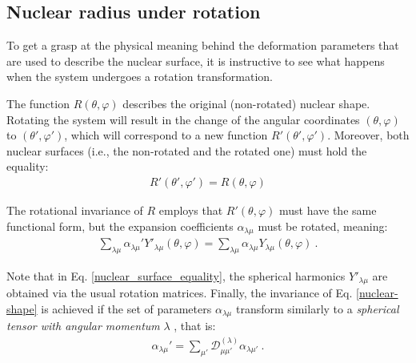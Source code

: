 \subsection{Nuclear radius under rotation}

To get a grasp at the physical meaning behind the deformation parameters that are used to describe the nuclear surface, it is instructive to see what happens when the system undergoes a rotation transformation.

The function $R(\theta,\varphi)$ describes the original (non-rotated) nuclear shape. Rotating the system will result in the change of the angular coordinates $(\theta,\varphi)$ to $(\theta',\varphi')$, which will correspond to a new function $R'(\theta',\varphi')$. Moreover, both nuclear surfaces (i.e., the non-rotated and the rotated one) must hold the equality:
\begin{align}
    R'(\theta',\varphi')=R(\theta,\varphi)
\end{align}

The rotational invariance of $R$ employs that $R'(\theta,\varphi)$ must have the same functional form, but the expansion coefficients $\alpha_{\lambda\mu}$ must be rotated, meaning:
\begin{align}
    \sum_{\lambda\mu}\alpha_{\lambda\mu}'Y'_{\lambda\mu}(
        \theta,\varphi)=\sum_{\lambda\mu}\alpha_{\lambda\mu}Y_{\lambda\mu}(
            \theta,\varphi)\ . \label{nuclear_surface_equality}
\end{align}

Note that in Eq. \ref{nuclear_surface_equality}, the spherical harmonics $Y'_{\lambda\mu}$ are obtained via the usual rotation matrices. Finally, the invariance of Eq. \ref{nuclear-shape} is achieved if the set of parameters $\alpha_{\lambda\mu}$ transform similarly to a \emph{spherical tensor with angular momentum} $\lambda$ \cite{ring2004nuclear}, that is:
\begin{align}
    \alpha_{\lambda\mu}'=\sum_{\mu'}\mathcal{D}^{(\lambda)}_{\mu\mu'}\alpha_{\lambda\mu'}\ .
\end{align}

